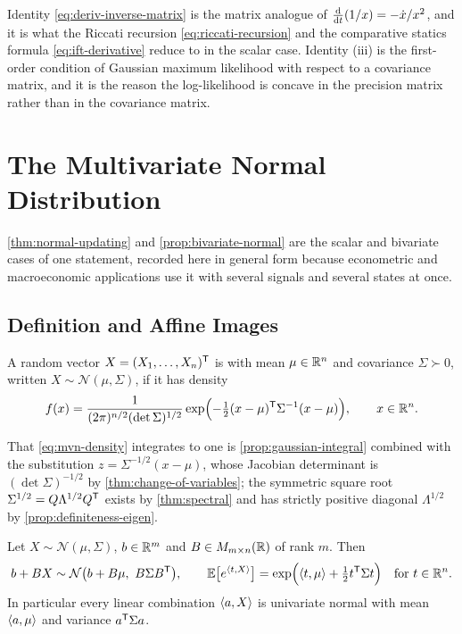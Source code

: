 Identity \eqref{eq:deriv-inverse-matrix} is the matrix analogue of
$\frac{\mathrm{d} }{\mathrm{d} t}(1/x)=-\dot x/x^{2}$, and it is what the Riccati recursion
\eqref{eq:riccati-recursion} and the comparative statics formula
\eqref{eq:ift-derivative} reduce to in the scalar case. Identity (iii) is the
first-order condition of Gaussian maximum likelihood with respect to a covariance
matrix, and it is the reason the log-likelihood is concave in the precision
matrix rather than in the covariance matrix.

\chapter{The Multivariate Normal Distribution}\label{app:normal}

\autoref{thm:normal-updating} and \autoref{prop:bivariate-normal} are the scalar
and bivariate cases of one statement, recorded here in general form because
econometric and macroeconomic applications use it with several signals and
several states at once.

\section{Definition and Affine Images}\label{sec:app-mvn}

\begin{definition}\label{def:mvn}
	A random vector $X=(X_1,\dots,X_n)^{\mathsf{T}}$ is  with mean $\mu\in\mathbb{R}^{n}$ and
	covariance $\Sigma\succ0$, written $X\sim\mathcal{N}(\mu,\Sigma)$, if it has
	density
	\begin{equation}\label{eq:mvn-density}
		f(x)=\frac{1}{(2\pi)^{n/2}(\det\Sigma)^{1/2}}
		\exp\Bigl(-\tfrac12(x-\mu)^{\mathsf{T}}\Sigma^{-1}(x-\mu)\Bigr),
		\qquad x\in\mathbb{R}^{n}.
	\end{equation}
\end{definition}

That \eqref{eq:mvn-density} integrates to one is
\autoref{prop:gaussian-integral} combined with the substitution
$z=\Sigma^{-1/2}(x-\mu)$, whose Jacobian determinant is
$(\det\Sigma)^{-1/2}$ by \autoref{thm:change-of-variables}; the symmetric square
root $\Sigma^{1/2}=Q\Lambda^{1/2}Q^{\mathsf{T}}$ exists by \autoref{thm:spectral}
and has strictly positive diagonal $\Lambda^{1/2}$ by
\autoref{prop:definiteness-eigen}.

\begin{proposition}\label{prop:mvn-affine}
	Let $X\sim\mathcal{N}(\mu,\Sigma)$, $b\in\mathbb{R}^{m}$ and $B\in M_{m\times n}(\mathbb{R})$ of
	rank $m$. Then
	\begin{equation}\label{eq:mvn-affine}
		b+BX\sim\mathcal{N}\bigl(b+B\mu,\ B\Sigma B^{\mathsf{T}}\bigr),
		\qquad
		\mathbb{E}\bigl[e^{\left\langle t,X\right\rangle}\bigr]
		=\exp\Bigl(\left\langle t,\mu\right\rangle+\tfrac12t^{\mathsf{T}}\Sigma t\Bigr)
		\quad\text{for }t\in\mathbb{R}^{n}.
	\end{equation}
	In particular every linear combination $\left\langle a,X\right\rangle$ is univariate normal with
	mean $\left\langle a,\mu\right\rangle$ and variance $a^{\mathsf{T}}\Sigma a$.
\end{proposition}

